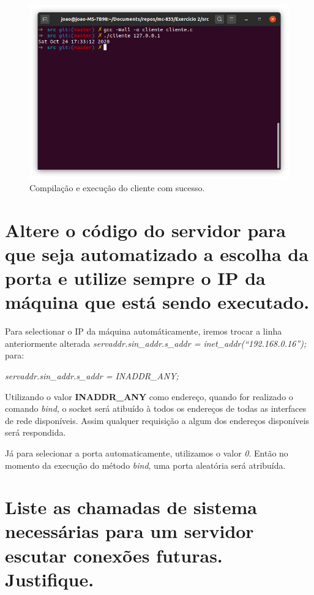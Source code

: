 \documentclass[12pt,a4paper]{report}
\begin{document}
\begin{figure}[H]
  \includegraphics[width=\linewidth]{cliente.png}
  \caption{Compilação e execução do cliente com sucesso.}
\end{figure}

\section{Altere o código do servidor para que seja automatizado a escolha da porta e utilize sempre o
IP da máquina que está sendo executado.}

Para selectionar o IP da máquina automáticamente, iremos trocar a linha anteriormente alterada \emph{servaddr.sin\_addr.s\_addr = inet\_addr(``192.168.0.16'');} para: 

\emph{servaddr.sin\_addr.s\_addr = INADDR\_ANY;}

\bigbreak

Utilizando o valor \textbf{INADDR\_ANY} como endereço, quando for realizado o comando \emph{bind}, 
o socket será atibuído à todos os endereços de todas as interfaces de rede disponíveis. 
Assim qualquer requisição a algum dos endereços disponíveis será respondida.

\bigbreak

Já para selecionar a porta automaticamente, utilizamos o valor \emph{0}. Então no momento da execução do método \emph{bind}, uma porta aleatória será atribuída.

\section{Liste as chamadas de sistema necessárias para um servidor escutar conexões futuras.
Justifique.}
\end{document}
